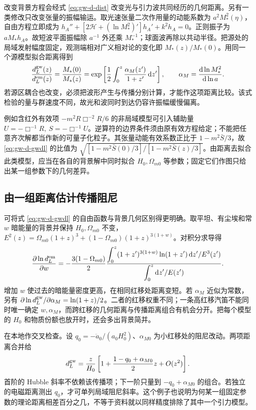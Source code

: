 改变背景方程会经式 \eqref{eq:gw-d-dist} 改变光与引力波共同经历的几何距离。另有一类修改只改变张量的振幅输运。取光速张量二次作用量的动能系数为 $a^2M_*^2(\eta)$，自由方程立即成为 $h_A''+\left[2\mathcal H+(\ln M_*^2)'\right]h_A'+k^2h_A=0$。正则振子为 $aM_*h_A$。故短波平面振幅除 $a^{-1}$ 外还乘 $M_*^{-1}$；球面波再除以共动半径。把源处的局域发射幅度固定，观测端相对广义相对论的变化即 $M_*(z)/M_*(0)$。用同一个源模型拟合距离得到
\begin{equation}\label{eq:gw-d-gwdl}
 \frac{d_L^{\rm gw}(z)}{d_L^{\rm em}(z)}
 =\frac{M_*(0)}{M_*(z)}
 =\exp\left[\frac12\int_0^z\frac{\alpha_M(z')}{1+z'}\,\mathrm dz'\right],
 \qquad \alpha_M=\frac{\mathrm d\ln M_*^2}{\mathrm d\ln a}.
\end{equation}
若源区耦合也改变，必须把波形产生与传播分别计算，才能作这项距离比较。该式检验的量与群速度不同，故光和波同时到达仍容许振幅缓慢偏离。

例如含红外有效项 $-m^2R\Box^{-2}R/6$ 的非局域模型可引入辅助量 $U=-\Box^{-1}R,\ S=-\Box^{-1}U$。逆算符的边界条件须由原有效方程给定；不能把任意齐次解都当作新的可量子化粒子。其张量动能有效系数正比于 $1-m^2\bar S/3$，故 \eqref{eq:gw-d-gwdl} 的比值为 $\sqrt{[1-m^2\bar S(0)/3]/[1-m^2\bar S(z)/3]}$。由距离去拟合此类模型，应当在各自的背景解中同时拟合 $H_0,\Omega_{m0}$ 等参数；固定它们作图只给出某一组参数下的几何差异。


\subsection{由一组距离估计传播阻尼}

可将式 \eqref{eq:gw-d-gwdl} 的自由函数与背景几何区别得更明确。取平坦、有尘埃和常 $w$ 暗能量的背景并保持 $H_0,\Omega_{m0}$ 不变，$E^2(z)=\Omega_{m0}(1+z)^3+(1-\Omega_{m0})(1+z)^{3(1+w)}$。对积分求导得
\[
 \frac{\partial\ln d_L^{\rm em}}{\partial w}
 =-\frac{3(1-\Omega_{m0})}{2}
 \frac{\displaystyle\int_0^z
 (1+z')^{3(1+w)}\ln(1+z')\,\mathrm dz'/E^3(z')}
 {\displaystyle\int_0^z \mathrm dz'/E(z')}.
\]
增加 $w$ 使过去的暗能量密度更高，在相同红移处距离变短。若 $\alpha_M$ 近似为常数，另有 $\partial\ln d_L^{\rm gw}/\partial\alpha_M=\ln(1+z)/2$。二者的红移权重不同；一条高红移汽笛不能同时唯一确定 $w,\alpha_M$，而跨红移的几何距离与传播距离组合有机会分开。把每个模型的 $H_0$ 和物质份额也放开时，还会多出背景简并。

在本地作交叉检查。设 $q_0=-\ddot a_0/(a_0H_0^2)$、$\alpha_{M0}$ 为小红移处的阻尼改动。两项距离合并给
\[
 d_L^{\rm gw}=\frac{z}{H_0}
 \left[1+\frac{1-q_0+\alpha_{M0}}{2}z+O(z^2)\right].
\]
首阶的 Hubble 斜率不依赖该传播项；下一阶只量到 $-q_0+\alpha_{M0}$ 的组合。若独立的电磁距离测出 $q_0$，才可单列局域阻尼斜率。这个例子也说明为何某一组固定参数的理论距离相差百分之几，不等于资料就以同样精度排除了其中一个引力模型。


